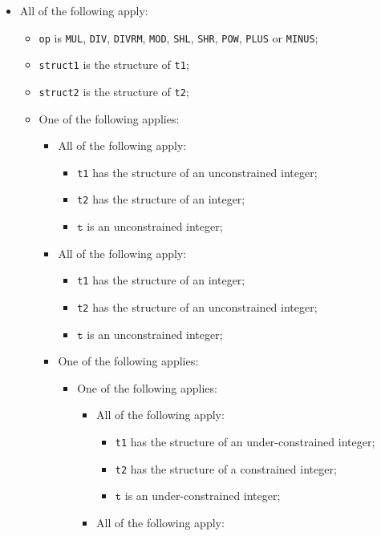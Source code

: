 \documentclass{book}
\newcommand\vt[0]{\texttt{t}}
\begin{document}
\begin{itemize}
  \item All of the following apply:
    \begin{itemize}
    \item \texttt{op} is \texttt{MUL}, \texttt{DIV}, \texttt{DIVRM}, \texttt{MOD}, \texttt{SHL}, \texttt{SHR}, \texttt{POW}, \texttt{PLUS} or \texttt{MINUS};
    \item \texttt{struct1} is the structure of \texttt{t1};
    \item \texttt{struct2} is the structure of \texttt{t2};
    \item One of the following applies:
      \begin{itemize}
      \item All of the following apply:
        \begin{itemize}
        \item \texttt{t1} has the structure of an unconstrained integer;
        \item \texttt{t2} has the structure of an integer;
        \item $\vt$ is an unconstrained integer;
        \end{itemize}
      \item All of the following apply:
        \begin{itemize}
        \item \texttt{t1} has the structure of an integer;
        \item \texttt{t2} has the structure of an unconstrained integer;
        \item $\vt$ is an unconstrained integer;
        \end{itemize}
      \item One of the following applies:
       \begin{itemize}
      \item One of the following applies:
       \begin{itemize}
       \item All of the following apply:
          \begin{itemize}
          \item \texttt{t1} has the structure of an under-constrained integer;
          \item \texttt{t2} has the structure of a constrained integer;
          \item $\vt$ is an under-constrained integer;
          \end{itemize}
        \item All of the following apply:
          \begin{itemize}

\end{itemize}
\end{itemize}
\end{itemize}
\end{itemize}
\end{itemize}
\end{itemize}
\end{document}
